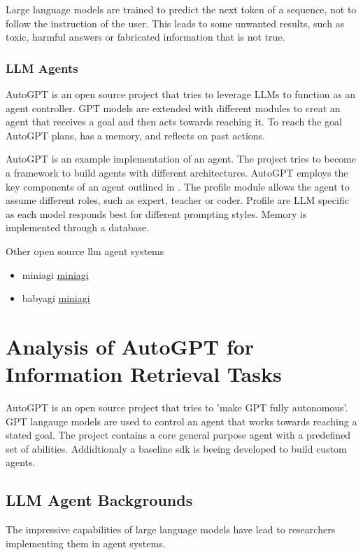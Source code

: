 \documentclass[english, version-2022-01]{uzl-thesis}
\begin{document}
Large language models are trained to predict the next token of a sequence, not to follow the instruction of the user. This leads to some unwanted results, such as toxic, harmful answers or fabricated information that is not true.

\subsection{LLM Agents}

AutoGPT is an open source project that tries to leverage LLMs to function as an agent controller. GPT models are extended with different modules to creat an agent that receives a goal and then acts towards reaching it. To reach the goal AutoGPT plans, has a memory, and reflects on past actions.

AutoGPT is an example implementation of an agent. The project tries to become a framework to build agents with different architectures.
AutoGPT employs the key components of an agent outlined in \cite{Wang2023}. The profile module allows the agent to assume different roles, such as expert, teacher or coder. Profile are LLM specific as each model responds best for different prompting styles. Memory is implemented through a database.

Other open source llm agent systems
\begin{itemize}
	\item miniagi \href{}{miniagi}
	\item babyagi \href{https://github.com/yoheinakajima/babyagi}{miniagi}
\end{itemize}

\chapter{Analysis of AutoGPT for Information Retrieval Tasks}


AutoGPT is an open source project that tries to 'make GPT fully autonomous'. GPT langauge models are used to control an agent that works towards reaching a stated goal. The project contains a core general purpose agent with a predefined set of abilities. Addidtionaly a baseline sdk is beeing developed to build custom agents.

\section{LLM Agent Backgrounds}

The impressive capabilities of large language models have lead to researchers implementing them in agent systems.
\end{document}
